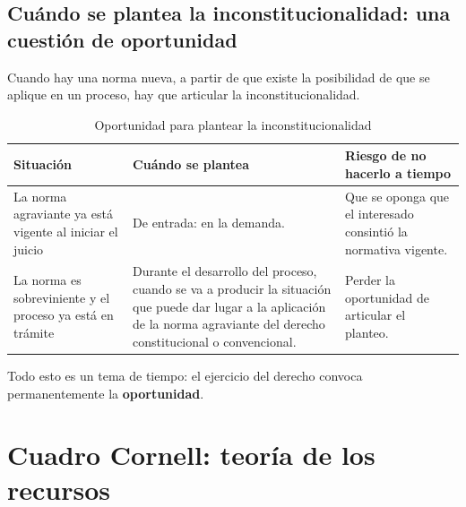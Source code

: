 \documentclass[12pt,oneside]{book}
\begin{document}

\subsection{Cuándo se plantea la inconstitucionalidad: una cuestión de oportunidad}

Cuando hay una norma nueva, a partir de que existe la posibilidad de que se aplique en un proceso, hay que articular la inconstitucionalidad.

\begin{table}[H]
\centering
\caption{Oportunidad para plantear la inconstitucionalidad}
\small
\begin{tabularx}{\textwidth}{>{\raggedright\arraybackslash}p{3.6cm} Y Y}
\toprule
\textbf{Situación} & \textbf{Cuándo se plantea} & \textbf{Riesgo de no hacerlo a tiempo} \\
\midrule
La norma agraviante ya está vigente al iniciar el juicio & De entrada: en la demanda. & Que se oponga que el interesado consintió la normativa vigente. \\
La norma es sobreviniente y el proceso ya está en trámite & Durante el desarrollo del proceso, cuando se va a producir la situación que puede dar lugar a la aplicación de la norma agraviante del derecho constitucional o convencional. & Perder la oportunidad de articular el planteo. \\
\bottomrule
\end{tabularx}
\end{table}

Todo esto es un tema de tiempo: el ejercicio del derecho convoca permanentemente la \textbf{oportunidad}.

\section*{Cuadro Cornell: teoría de los recursos}
\end{document}
